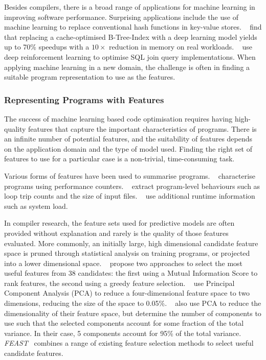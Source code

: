 Besides compilers, there is a broad range of applications for machine learning in improving software performance. Surprising applications include the use of machine learning to replace conventional hash functions in key-value stores. \citeauthor{Kraska2017}~\cite{Kraska2017} find that replacing a cache-optimised B-Tree-Index with a deep learning model yields up to 70\% speedups with a $10\times$ reduction in memory on real workloads. \citeauthor{Krishnan2018}~\cite{Krishnan2018} use deep reinforcement learning to optimise SQL join query implementations. When applying machine learning in a new domain, the challenge is often in finding a suitable program representation to use as the features.


\subsubsection{Representing Programs with Features}

The success of machine learning based code optimisation requires having high-quality features that capture the important characteristics of programs. There is an infinite number of potential features, and the suitability of features depends on the application domain and the type of model used. Finding the right set of features to use for a particular case is a non-trivial, time-consuming task.

Various forms of features have been used to summarise programs. \citeauthor{Dubach2009}~\cite{Dubach2009} characterise programs using performance counters. \citeauthor{Jiang2010}~\cite{Jiang2010} extract program-level behaviours such as loop trip counts and the size of input files. \citeauthor{Berral2010a}~\cite{Berral2010a} use additional runtime information such as system load.

In compiler research, the feature sets used for predictive models are often provided without explanation and rarely is the quality of those features evaluated. More commonly, an initially large, high dimensional candidate feature space is pruned through statistical analysis on training programs, or projected into a lower dimensional space. \citeauthor{Stephenson2005}~\cite{Stephenson2005} propose two approaches to select the most useful features from 38 candidates: the first using a Mutual Information Score to rank features, the second using a greedy feature selection. \citeauthor{Collins2013}~\cite{Collins2013} use Principal Component Analysis (PCA) to reduce a four-dimensional feature space to two dimensions, reducing the size of the space to 0.05\%. \citeauthor{Dubach2007}~\cite{Dubach2007} also use PCA to reduce the dimensionality of their feature space, but determine the number of components to use such that the selected components account for some fraction of the total variance. In their case, 5 components account for 95\% of the total variance. \emph{FEAST}~\cite{Ting2016} combines a range of existing feature selection methods to select useful candidate features.

